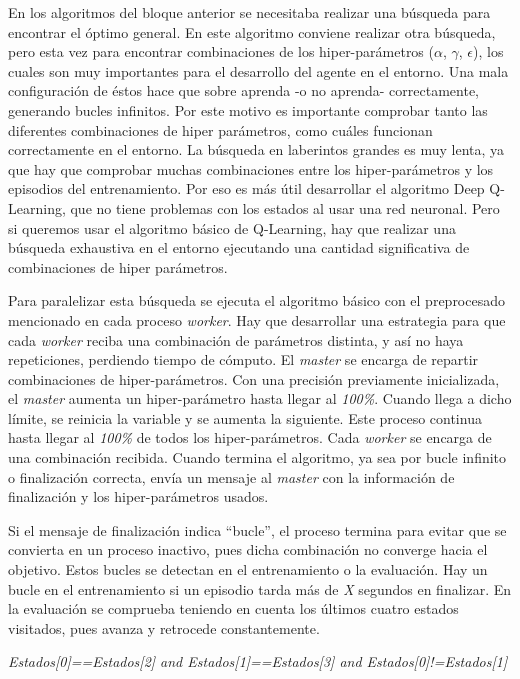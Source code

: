 		
			
		En los algoritmos del bloque anterior se necesitaba realizar una búsqueda para encontrar el óptimo general. En este algoritmo conviene realizar otra búsqueda, pero esta vez para encontrar combinaciones de los hiper-parámetros ($\alpha$, $\gamma$, $\epsilon$), los cuales son muy importantes para el desarrollo del agente en el entorno. Una mala configuración de éstos hace que sobre aprenda -o no aprenda- correctamente, generando bucles infinitos. Por este motivo es importante comprobar tanto las diferentes combinaciones de hiper parámetros, como cuáles funcionan correctamente en el entorno. La búsqueda en laberintos grandes es muy lenta, ya que hay que comprobar muchas combinaciones entre los hiper-parámetros y los episodios del entrenamiento. Por eso es más útil desarrollar el algoritmo Deep Q-Learning, que no tiene problemas con los estados al usar una red neuronal. Pero si queremos usar el algoritmo básico de Q-Learning, hay que realizar una búsqueda exhaustiva en el entorno ejecutando una cantidad significativa de combinaciones de hiper parámetros.

		Para paralelizar esta búsqueda se ejecuta el algoritmo básico con el preprocesado mencionado en cada proceso \textit{worker}. Hay que desarrollar una estrategia para que cada \textit{worker} reciba una combinación de parámetros distinta, y así no haya repeticiones, perdiendo tiempo de cómputo. El \textit{master} se encarga de repartir combinaciones de hiper-parámetros. Con una precisión previamente inicializada, el \textit{master} aumenta un hiper-parámetro hasta llegar al \textit{100\%}. Cuando llega a dicho límite, se reinicia la variable y se aumenta la siguiente. Este proceso continua hasta llegar al \textit{100\%} de todos los hiper-parámetros. Cada \textit{worker} se encarga de una combinación recibida. Cuando termina el algoritmo, ya sea por bucle infinito o finalización correcta, envía un mensaje al \textit{master} con la información de finalización y los hiper-parámetros usados.
		
		Si el mensaje de finalización indica ``bucle'', el proceso termina para evitar que se convierta en un proceso inactivo, pues dicha combinación no converge hacia el objetivo. Estos bucles se detectan en el entrenamiento o la evaluación. Hay un bucle en el entrenamiento si un episodio tarda más de \textit{X} segundos en finalizar. En la evaluación se comprueba teniendo en cuenta los últimos cuatro estados visitados, pues avanza y retrocede constantemente. 
		\begin{center}
			\textit{Estados[0]==Estados[2] and Estados[1]==Estados[3] and Estados[0]!=Estados[1] }
		\end{center}
		

